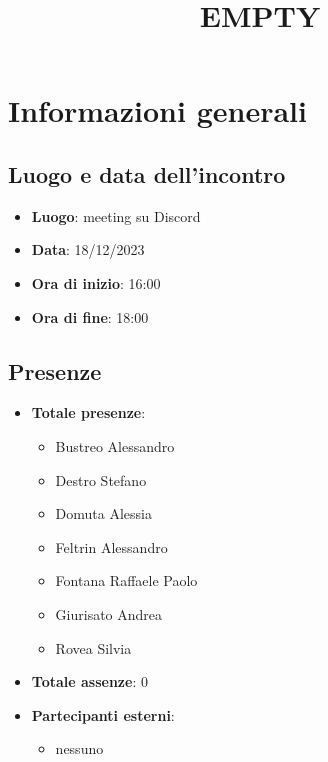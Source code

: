\documentclass[12pt]{article}
\title{EMPTY}
\begin{document}
	\makefirstpage
	
	
	\clearpage
	
	\tableofcontents
	\clearpage

    \section{Informazioni generali}
	
	\subsection{Luogo e data dell'incontro}
	
    	\begin{itemize}
    		\item \textbf{Luogo}: meeting su Discord
    		\item \textbf{Data}: 18/12/2023
    		\item \textbf{Ora di inizio}: 16:00
    		\item \textbf{Ora di fine}: 18:00
    	\end{itemize}
	
	\subsection{Presenze}
	
    	\begin{itemize}
    		\item \textbf{Totale presenze}:
    		\begin{itemize}
    			\item Bustreo Alessandro
    			\item Destro Stefano
    			\item Domuta Alessia 
    			\item Feltrin Alessandro 
    			\item Fontana Raffaele Paolo 
    			\item Giurisato Andrea 
    			\item Rovea Silvia
    		\end{itemize}
    		
    		\item \textbf{Totale assenze}: 0
    		
    		\item \textbf{Partecipanti esterni}:
    		\begin{itemize}
    			\item nessuno
    		\end{itemize}
    	\end{itemize}
\end{document}
